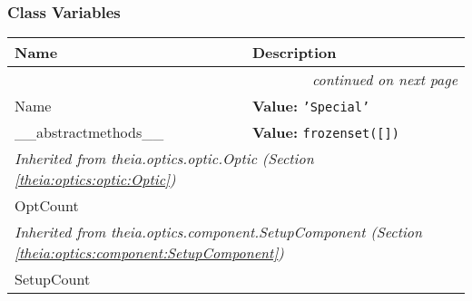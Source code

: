   \subsubsection{Class Variables}

    \vspace{-1cm}
\hspace{\varindent}\begin{longtable}{|p{\varnamewidth}|p{\vardescrwidth}|l}
\cline{1-2}
\cline{1-2} \centering \textbf{Name} & \centering \textbf{Description}& \\
\cline{1-2}
\endhead\cline{1-2}\multicolumn{3}{r}{\small\textit{continued on next page}}\\\endfoot\cline{1-2}
\endlastfoot\raggedright N\-a\-m\-e\- & \raggedright \textbf{Value:} 
{\tt \texttt{'}\texttt{Special}\texttt{'}}&\\
\cline{1-2}
\raggedright \_\-\_\-a\-b\-s\-t\-r\-a\-c\-t\-m\-e\-t\-h\-o\-d\-s\-\_\-\_\- & \raggedright \textbf{Value:} 
{\tt \texttt{frozenset([}\texttt{])}}&\\
\cline{1-2}
\multicolumn{2}{|l|}{\textit{Inherited from theia.optics.optic.Optic \textit{(Section \ref{theia:optics:optic:Optic})}}}\\
\multicolumn{2}{|p{\varwidth}|}{\raggedright OptCount}\\
\cline{1-2}
\multicolumn{2}{|l|}{\textit{Inherited from theia.optics.component.SetupComponent \textit{(Section \ref{theia:optics:component:SetupComponent})}}}\\
\multicolumn{2}{|p{\varwidth}|}{\raggedright SetupCount}\\
\cline{1-2}
\end{longtable}

